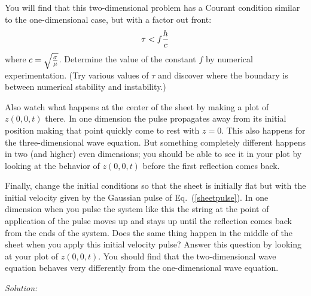 \begin{enumerate}
\begin{enumerate}
\subprob You will find that this two-dimensional problem has
    a Courant condition similar to the one-dimensional case,
    but with a factor out front:
    \begin{equation}
        \tau < f {h \over c}
    \end{equation}
    where $c = \sqrt{\sigma \over \mu}$.  Determine the value of the
    constant $f$ by numerical experimentation. (Try various values of
    $\tau$ and discover where the boundary is between numerical
    stability and instability.)

\subprob Also watch what happens at the center of the sheet
    by making a plot of $z(0,0,t)$ there. In one dimension
    the pulse propagates away from its initial position
    making that point quickly come to rest with $z=0$. This
    also happens for the three-dimensional wave equation. But
    something completely different happens in two (and
    higher) even dimensions; you should be able to see it in
    your plot by looking at the behavior of $z(0,0,t)$ before
    the first reflection comes back.


\subprob Finally, change the initial conditions so that the
    sheet is initially flat but with the initial velocity
    given by the Gaussian pulse of Eq.~(\ref{sheetpulse}). In
    one dimension when you pulse the system like this the
    string at the point of application of the pulse moves up
    and stays up until the reflection comes back from the
    ends of the system. Does the same thing happen in
    the middle of the sheet when you apply this initial
    velocity pulse? Answer this question by looking at your
    plot of $z(0,0,t)$. You should find that the
    two-dimensional wave equation behaves very differently
    from the one-dimensional wave equation.
\end{enumerate}
\end{enumerate}
\ifsolutions
\textit{Solution:}\\
